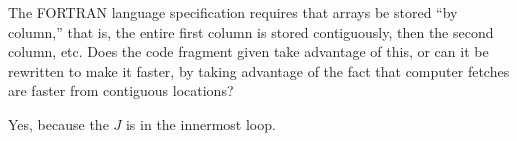 \begin{exercises}
  \item The \textsc{FORTRAN} language specification requires that arrays be
    stored ``by column,'' that is, the entire first column is stored
    contiguously, then the second column, etc.
    Does the code fragment given take advantage of this,
    or can it be rewritten to make it faster, by taking advantage of
    the fact that computer fetches are faster from contiguous locations?
    \begin{answer}
      Yes, because the $J$ is in the innermost loop.
    \end{answer}
\end{exercises}
\endinput
